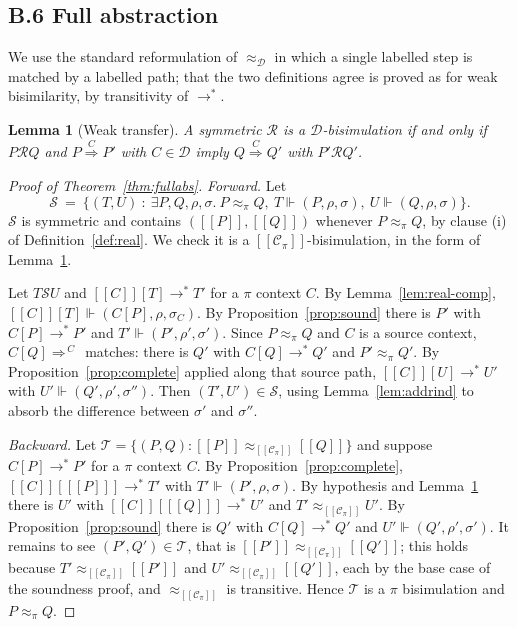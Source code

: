 \documentclass[11pt]{article}
\theoremstyle{definition}
\theoremstyle{plain}
\newtheorem{lemma}[definition]{Lemma}
\theoremstyle{remark}
\newcommand{\enc}[1]{[\![#1]\!]}
\newcommand{\Ctx}{\mathscr{C}}
\newcommand{\Obs}{\mathcal{D}}
\newcommand{\bisim}{\approx}
\newcommand{\real}{\Vdash}
\providecommand{\xLongrightarrow}[1]{\mathrel{\overset{#1}{\Longrightarrow}}}
\begin{document}
\subsection{B.6 Full abstraction}

We use the standard reformulation of $\bisim_\Obs$ in which a single
labelled step is matched by a labelled path; that the two definitions
agree is proved as for weak bisimilarity, by transitivity of $\to^*$.

\begin{lemma}[Weak transfer]\label{lem:weaktransfer}
A symmetric $\mathcal{R}$ is a $\Obs$-bisimulation if and only if
$P \mathrel{\mathcal{R}} Q$ and $P \xLongrightarrow{\,C\,} P'$ with
$C \in \Obs$ imply $Q \xLongrightarrow{\,C\,} Q'$ with
$P' \mathrel{\mathcal{R}} Q'$.
\end{lemma}

\begin{proof}[Proof of Theorem~\ref{thm:fullabs}]
\emph{Forward.} Let
\[
  \mathcal{S} \ =\ \{(T,U) \ :\ \exists P,Q,\rho,\sigma.\
  P \bisim_\pi Q,\ T \real (P,\rho,\sigma),\ U \real (Q,\rho,\sigma)\}.
\]
$\mathcal{S}$ is symmetric and contains $(\enc{P},\enc{Q})$ whenever
$P \bisim_\pi Q$, by clause (i) of Definition~\ref{def:real}. We check it
is a $\enc{\Ctx_\pi}$-bisimulation, in the form of
Lemma~\ref{lem:weaktransfer}.

Let $T \mathrel{\mathcal{S}} U$ and $\enc{C}[T] \to^* T'$ for a $\pi$
context $C$. By Lemma~\ref{lem:real-comp}, $\enc{C}[T] \real
(C[P],\rho,\sigma_C)$. By Proposition~\ref{prop:sound} there is $P'$ with
$C[P] \to^* P'$ and $T' \real (P',\rho',\sigma')$. Since
$P \bisim_\pi Q$ and $C$ is a source context, $C[Q] \Longrightarrow^{\,C\,}$
matches: there is $Q'$ with $C[Q] \to^* Q'$ and $P' \bisim_\pi Q'$. By
Proposition~\ref{prop:complete} applied along that source path,
$\enc{C}[U] \to^* U'$ with $U' \real (Q',\rho',\sigma'')$. Then
$(T',U') \in \mathcal{S}$, using Lemma~\ref{lem:addrind} to absorb the
difference between $\sigma'$ and $\sigma''$.

\emph{Backward.} Let
$\mathcal{T} = \{(P,Q) : \enc{P} \bisim_{\enc{\Ctx_\pi}} \enc{Q}\}$ and
suppose $C[P] \to^* P'$ for a $\pi$ context $C$. By
Proposition~\ref{prop:complete}, $\enc{C}[\enc{P}] \to^* T'$ with
$T' \real (P',\rho,\sigma)$. By hypothesis and
Lemma~\ref{lem:weaktransfer} there is $U'$ with
$\enc{C}[\enc{Q}] \to^* U'$ and $T' \bisim_{\enc{\Ctx_\pi}} U'$. By
Proposition~\ref{prop:sound} there is $Q'$ with $C[Q] \to^* Q'$ and
$U' \real (Q',\rho',\sigma')$. It remains to see
$(P',Q') \in \mathcal{T}$, that is
$\enc{P'} \bisim_{\enc{\Ctx_\pi}} \enc{Q'}$; this holds because
$T' \bisim_{\enc{\Ctx_\pi}} \enc{P'}$ and
$U' \bisim_{\enc{\Ctx_\pi}} \enc{Q'}$, each by the base case of the
soundness proof, and $\bisim_{\enc{\Ctx_\pi}}$ is transitive. Hence
$\mathcal{T}$ is a $\pi$ bisimulation and $P \bisim_\pi Q$.
\end{proof}
\end{document}
